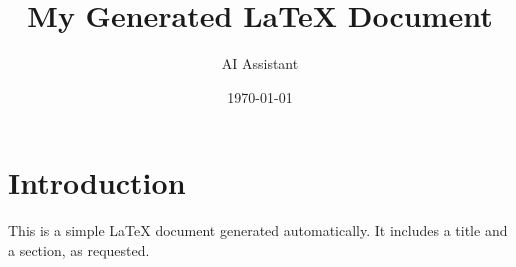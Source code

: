 \documentclass{article}
\title{My Generated LaTeX Document}
\author{AI Assistant}
\date{\today}
\begin{document}
\maketitle

\section{Introduction}
This is a simple LaTeX document generated automatically. It includes a title and a section, as requested.
\end{document}
